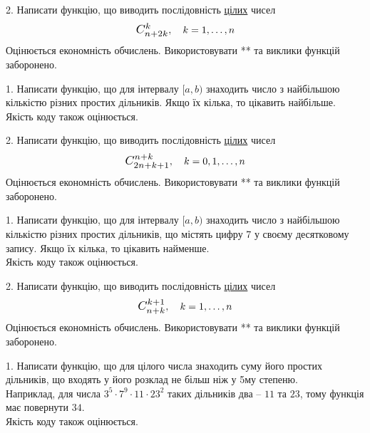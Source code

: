 \documentclass[12pt, ukrainian]{article}
\begin{document}
\begin{Large}
\vspace{10mm}

\newpage

2. 
Написати функцію, що виводить послідовність \underline{цілих} чисел
$$\scalebox{1.2}{$C_{n+2k}^{k}$}, \quad k=1,\ldots,n$$
Оцінюється економність обчислень. Використовувати ** та виклики функцій заборонено.

\newpage




1. Написати функцію, що для інтервалу $[a, b)$ знаходить число з найбільшою кількістю різних простих дільників. Якщо їх кілька, то цікавить найбільше.\\	Якість коду також оцінюється. 



\vspace{10mm}

\newpage

2. 
Написати функцію, що виводить послідовність \underline{цілих} чисел
$$\scalebox{1.2}{$C_{2n+k+1}^{n+k}$}, \quad k=0,1,\ldots,n$$
Оцінюється економність обчислень. Використовувати ** та виклики функцій заборонено.

\newpage




1. Написати функцію, що для інтервалу $[a, b)$ знаходить число з найбільшою кількістю різних простих дільників, що містять цифру 7 у своєму десятковому запису. Якщо їх кілька, то цікавить найменше.\\	Якість коду також оцінюється. 



\vspace{10mm}

\newpage

2. 
Написати функцію, що виводить послідовність \underline{цілих} чисел
$$\scalebox{1.2}{$C_{n+k}^{k+1}$}, \quad k=1,\ldots,n$$
Оцінюється економність обчислень. Використовувати ** та виклики функцій заборонено.

\newpage




1. Написати функцію, що для цілого числа знаходить суму його простих дільників, що входять у його розклад не більш ніж у 5му степеню. \\ Наприклад, для числа $3^5{\cdot}7^9{\cdot}11{\cdot}23^{2}$ таких дільників два – $11$ та $23$, тому функція має повернути $34$.\\	Якість коду також оцінюється. 




\end{Large}
\end{document}
